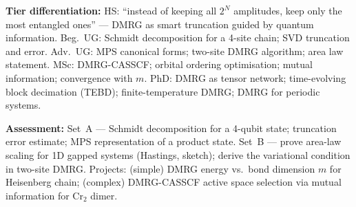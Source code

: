 \documentclass[11pt,a4paper]{article}
\begin{document}
\begin{tcolorbox}[modulebox, title={Module~II.1 --- Lecture L07: Density Matrix Renormalisation Group}]
\medskip\textbf{Tier differentiation:}
HS: ``instead of keeping all $2^N$ amplitudes, keep only the most entangled ones'' ---
DMRG as smart truncation guided by quantum information.
Beg.\ UG: Schmidt decomposition for a 4-site chain; SVD truncation and error.
Adv.\ UG: MPS canonical forms; two-site DMRG algorithm; area law statement.
MSc: DMRG-CASSCF; orbital ordering optimisation; mutual information; convergence with $m$.
PhD: DMRG as tensor network; time-evolving block decimation (TEBD); finite-temperature DMRG;
DMRG for periodic systems.

\medskip\textbf{Assessment:}
Set~A --- Schmidt decomposition for a 4-qubit state; truncation error estimate;
MPS representation of a product state.
Set~B --- prove area-law scaling for 1D gapped systems (Hastings, sketch);
derive the variational condition in two-site DMRG.
Projects: (simple) DMRG energy vs.\ bond dimension $m$ for Heisenberg chain;
(complex) DMRG-CASSCF active space selection via mutual information for Cr$_2$ dimer.
\end{tcolorbox}

\medskip
\end{document}
